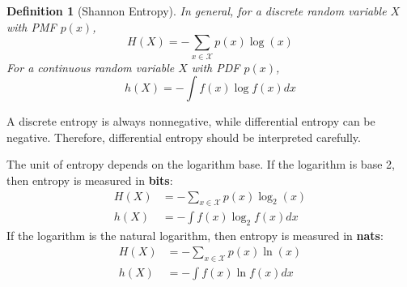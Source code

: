 \documentclass[11pt]{report}
\theoremstyle{lecturedefinition}
\newtheorem{definition}{Definition}
\theoremstyle{lectureremark}
\begin{document}
\begin{definition}[Shannon Entropy]
In general, for a discrete random variable $X$ with PMF $p(x)$,
\[
H(X)=-\sum_{x\in\mathcal{X}}p(x)\log(x)
\] 
For a continuous random variable $X$ with PDF $p(x)$,
\[
h(X)=-\int f(x)\log f(x) dx
\]
\end{definition}

\begin{InsightBox}
A discrete entropy is always nonnegative, while differential entropy can be negative. Therefore, differential entropy should be interpreted carefully.
\end{InsightBox}

The unit of entropy depends on the logarithm base. If the logarithm is base 2, then entropy is measured in \textbf{bits}:
\begin{equation}
\begin{aligned}
    H(X)&=-\sum_{x\in\mathcal{X}}p(x)\log_2(x)\\
    h(X)&=-\int f(x)\log_2 f(x) dx
\end{aligned}
\end{equation}
If the logarithm is the natural logarithm, then entropy is measured in \textbf{nats}:
\begin{equation}
\begin{aligned}
    H(X)&=-\sum_{x\in\mathcal{X}}p(x)\ln(x)\\
    h(X)&=-\int f(x)\ln f(x) dx
\end{aligned}
\end{equation}
\end{document}
